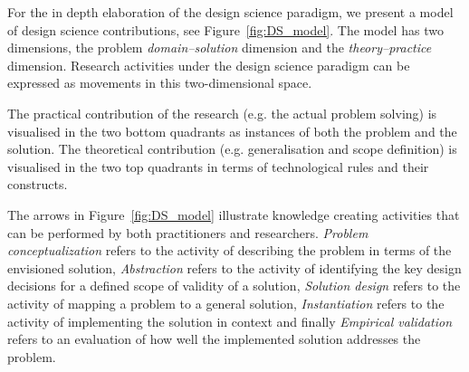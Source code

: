 \documentclass[graybox]{svmult}
\begin{document}

For the in depth elaboration of the design science paradigm, we present a model of design science contributions, see Figure~\ref{fig:DS_model}. The model has two dimensions,  the problem \emph{domain--solution} dimension and the \emph{theory--practice} dimension. Research activities under the design science paradigm can be expressed as movements in this two-dimensional space.

The practical contribution of the research (e.g. the actual problem solving) is visualised in the two bottom quadrants as instances of both the problem and the solution. The theoretical contribution (e.g. generalisation and scope definition) is visualised in the two top quadrants in terms of technological rules and their constructs. 

The arrows in Figure~\ref{fig:DS_model} illustrate knowledge creating activities that can be performed by both practitioners and researchers. \emph{Problem conceptualization} refers to the activity of describing the problem in terms of the envisioned solution, \emph{Abstraction} refers to the activity of identifying the key design decisions for a defined scope of validity of a solution, \emph{Solution design} refers to the activity of mapping a problem to a general solution, \emph{Instantiation} refers to the activity of implementing the solution in context and finally \emph{Empirical validation} refers to an evaluation of how well the implemented solution addresses the problem.
\end{document}
